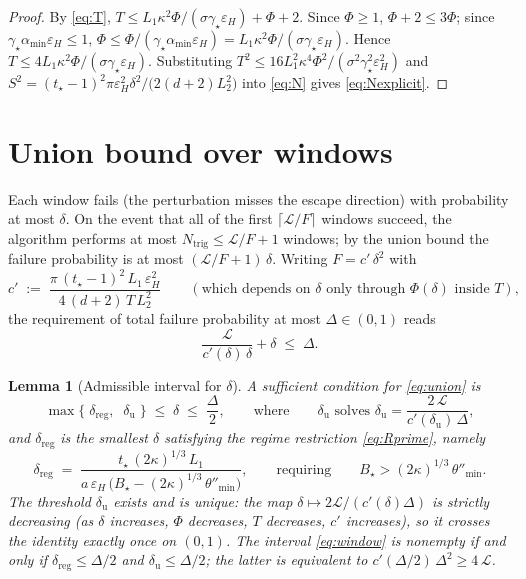 \documentclass[11pt,a4paper]{article}
\theoremstyle{plain}
\newtheorem{lemma}{Lemma}
\theoremstyle{definition}
\newcommand{\eps}{\varepsilon}
\newcommand{\epsH}{\eps_{H}}
\newcommand{\LL}{\mathcal{L}}
\newcommand{\Ntrig}{N_{\mathrm{trig}}}
\newcommand{\tstar}{t_\star}
\newcommand{\thetamin}{\theta''_{\min}}
\newcommand{\amin}{\alpha_{\min}}
\begin{document}
\begin{proof}
By \eqref{eq:T}, $T \le L_1\kappa^2\Phi/(\sigma\gamma_\star\epsH) + \Phi + 2$.
Since $\Phi \ge 1$, $\Phi + 2 \le 3\Phi$; since
$\gamma_\star\amin\epsH \le 1$,
$\Phi \le \Phi/(\gamma_\star\amin\epsH)
= L_1\kappa^2\Phi/(\sigma\gamma_\star\epsH)$. Hence
$T \le 4L_1\kappa^2\Phi/(\sigma\gamma_\star\epsH)$. Substituting
$T^2 \le 16L_1^2\kappa^4\Phi^2/(\sigma^2\gamma_\star^2\epsH^2)$ and
$S^2 = (\tstar-1)^2\pi\epsH^2\delta^2/\bigl(2(d+2)L_2^2\bigr)$ into
\eqref{eq:N} gives \eqref{eq:Nexplicit}.
\end{proof}

\section{Union bound over windows}\label{sec:union}

Each window fails (the perturbation misses the escape direction) with
probability at most $\delta$. On the event that all of the first
$\lceil \LL/F\rceil$ windows succeed, the algorithm performs at most
$\Ntrig \le \LL/F + 1$ windows; by the union bound the failure probability
is at most $(\LL/F + 1)\,\delta$. Writing $F = c'\,\delta^2$ with
\begin{equation}\label{eq:cprime}
c' \;:=\; \frac{\pi\,(\tstar-1)^2\,L_1\,\epsH^2}{4\,(d+2)\,T\,L_2^2}
\qquad (\text{which depends on } \delta \text{ only through }
\Phi(\delta) \text{ inside } T),
\end{equation}
the requirement of total failure probability at most
$\Delta \in (0,1)$ reads
\begin{equation}\label{eq:union}
\frac{\LL}{c'(\delta)\,\delta} + \delta \;\le\; \Delta .
\tag{U}
\end{equation}

\begin{lemma}[Admissible interval for $\delta$]\label{lem:admissible}
A sufficient condition for \eqref{eq:union} is
\begin{equation}\label{eq:window}
\max\Big\{\;\delta_{\mathrm{reg}},\;\;
\delta_{\mathrm{u}}\;\Big\}
\;\le\; \delta \;\le\; \frac{\Delta}{2},
\qquad\text{where}\qquad
\delta_{\mathrm{u}} \text{ solves } \delta_{\mathrm{u}} =
\frac{2\,\LL}{c'(\delta_{\mathrm{u}})\,\Delta},
\end{equation}
and $\delta_{\mathrm{reg}}$ is the smallest $\delta$ satisfying the regime
restriction \eqref{eq:Rprime}, namely
\begin{equation}\label{eq:deltareg}
\delta_{\mathrm{reg}} \;=\;
\frac{\tstar\,(2\kappa)^{1/3}\,L_1}
{a\,\epsH\,\big(B_\star - (2\kappa)^{1/3}\,\thetamin\big)},
\qquad\text{requiring}\qquad
B_\star > (2\kappa)^{1/3}\,\thetamin .
\end{equation}
The threshold $\delta_{\mathrm{u}}$ exists and is unique: the map
$\delta \mapsto 2\LL/(c'(\delta)\Delta)$ is strictly decreasing (as
$\delta$ increases, $\Phi$ decreases, $T$ decreases, $c'$ increases), so it
crosses the identity exactly once on $(0,1)$.
The interval \eqref{eq:window} is nonempty if and only if
$\delta_{\mathrm{reg}} \le \Delta/2$ and
$\delta_{\mathrm{u}} \le \Delta/2$; the latter is equivalent to
$c'(\Delta/2)\,\Delta^2 \ge 4\,\LL$.
\end{lemma}
\end{document}
